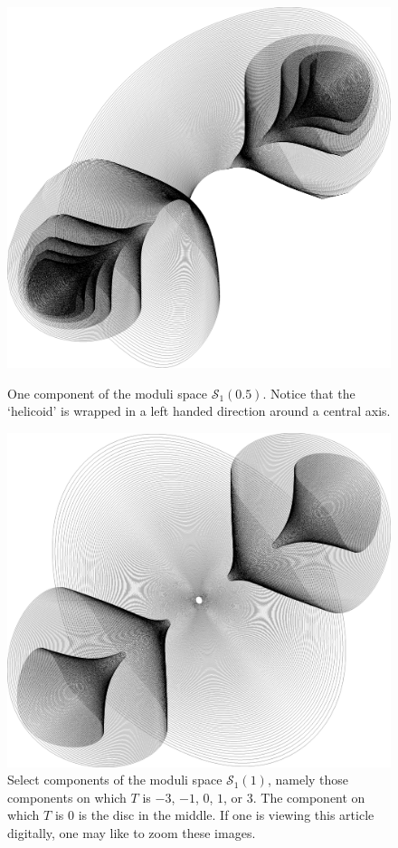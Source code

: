 \documentclass{article}
\numberwithin{equation}{section}
\numberwithin{figure}{section}
\begin{document}
\begin{figure}[p]
    \centering
    \includegraphics[height=0.4\textheight]{graphics/moduli_plot_p05.png}
    \caption{One component of the moduli space $\mathcal{S}_1(0.5)$. Notice that the `helicoid' is wrapped in a left handed direction around a central axis.\label{fig:p05 plot}}

    \vspace*{\floatsep}

    \includegraphics[height=0.37\textheight]{graphics/moduli_plot_p1.png}
    \caption{Select components of the moduli space $\mathcal{S}_1(1)$, namely those components on which $T$ is $-3$, $-1$, $0$, $1$, or $3$. The component on which $T$ is $0$ is the disc in the middle. If one is viewing this article digitally, one may like to zoom these images.\label{fig:p1 plot}}
\end{figure}
\end{document}
